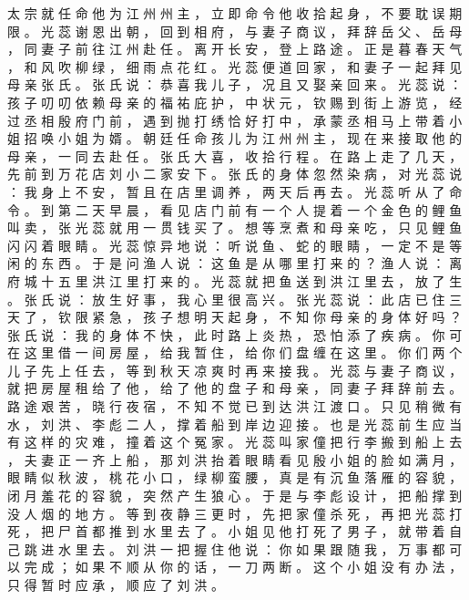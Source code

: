 {太 宗 就 任 命 他 为 江 州 州 主 ， 立 即 命 令 他 收 拾 起 身 ， 不 要 耽 误 期 限 。
光 蕊 谢 恩 出 朝 ， 回 到 相 府 ， 与 妻 子 商 议 ， 拜 辞 岳 父 、 岳 母 ， 同 妻 子 前 往 江 州 赴 任 。
离 开 长 安 ， 登 上 路 途 。
正 是 暮 春 天 气 ， 和 风 吹 柳 绿 ， 细 雨 点 花 红 。
光 蕊 便 道 回 家 ， 和 妻 子 一 起 拜 见 母 亲 张 氏 。
张 氏 说 ： 恭 喜 我 儿 子 ， 况 且 又 娶 亲 回 来 。
光 蕊 说 ： 孩 子 叨 叨 依 赖 母 亲 的 福 祐 庇 护 ， 中 状 元 ， 钦 赐 到 街 上 游 览 ， 经 过 丞 相 殷 府 门 前 ， 遇 到 抛 打 绣 恰 好 打 中 ， 承 蒙 丞 相 马 上 带 着 小 姐 招 唤 小 姐 为 婿 。
朝 廷 任 命 孩 儿 为 江 州 州 主 ， 现 在 来 接 取 他 的 母 亲 ， 一 同 去 赴 任 。
张 氏 大 喜 ， 收 拾 行 程 。
在 路 上 走 了 几 天 ， 先 前 到 万 花 店 刘 小 二 家 安 下 。
张 氏 的 身 体 忽 然 染 病 ， 对 光 蕊 说 ： 我 身 上 不 安 ， 暂 且 在 店 里 调 养 ， 两 天 后 再 去 。
光 蕊 听 从 了 命 令 。
到 第 二 天 早 晨 ， 看 见 店 门 前 有 一 个 人 提 着 一 个 金 色 的 鲤 鱼 叫 卖 ， 张 光 蕊 就 用 一 贯 钱 买 了 。
想 等 烹 煮 和 母 亲 吃 ， 只 见 鲤 鱼 闪 闪 着 眼 睛 。
光 蕊 惊 异 地 说 ： 听 说 鱼 、 蛇 的 眼 睛 ， 一 定 不 是 等 闲 的 东 西 。
于 是 问 渔 人 说 ： 这 鱼 是 从 哪 里 打 来 的 ？ 渔 人 说 ： 离 府 城 十 五 里 洪 江 里 打 来 的 。
光 蕊 就 把 鱼 送 到 洪 江 里 去 ， 放 了 生 。
张 氏 说 ： 放 生 好 事 ， 我 心 里 很 高 兴 。
张 光 蕊 说 ： 此 店 已 住 三 天 了 ， 钦 限 紧 急 ， 孩 子 想 明 天 起 身 ， 不 知 你 母 亲 的 身 体 好 吗 ？ 张 氏 说 ： 我 的 身 体 不 快 ， 此 时 路 上 炎 热 ， 恐 怕 添 了 疾 病 。
你 可 在 这 里 借 一 间 房 屋 ， 给 我 暂 住 ， 给 你 们 盘 缠 在 这 里 。
你 们 两 个 儿 子 先 上 任 去 ， 等 到 秋 天 凉 爽 时 再 来 接 我 。
光 蕊 与 妻 子 商 议 ， 就 把 房 屋 租 给 了 他 ， 给 了 他 的 盘 子 和 母 亲 ， 同 妻 子 拜 辞 前 去 。
路 途 艰 苦 ， 晓 行 夜 宿 ， 不 知 不 觉 已 到 达 洪 江 渡 口 。
只 见 稍 微 有 水 ， 刘 洪 、 李 彪 二 人 ， 撑 着 船 到 岸 边 迎 接 。
也 是 光 蕊 前 生 应 当 有 这 样 的 灾 难 ， 撞 着 这 个 冤 家 。
光 蕊 叫 家 僮 把 行 李 搬 到 船 上 去 ， 夫 妻 正 一 齐 上 船 ， 那 刘 洪 抬 着 眼 睛 看 见 殷 小 姐 的 脸 如 满 月 ， 眼 睛 似 秋 波 ， 桃 花 小 口 ， 绿 柳 蛮 腰 ， 真 是 有 沉 鱼 落 雁 的 容 貌 ， 闭 月 羞 花 的 容 貌 ， 突 然 产 生 狼 心 。
于 是 与 李 彪 设 计 ， 把 船 撑 到 没 人 烟 的 地 方 。
等 到 夜 静 三 更 时 ， 先 把 家 僮 杀 死 ， 再 把 光 蕊 打 死 ， 把 尸 首 都 推 到 水 里 去 了 。
小 姐 见 他 打 死 了 男 子 ， 就 带 着 自 己 跳 进 水 里 去 。
刘 洪 一 把 握 住 他 说 ： 你 如 果 跟 随 我 ， 万 事 都 可 以 完 成 ； 如 果 不 顺 从 你 的 话 ， 一 刀 两 断 。
这 个 小 姐 没 有 办 法 ， 只 得 暂 时 应 承 ， 顺 应 了 刘 洪 。
}
